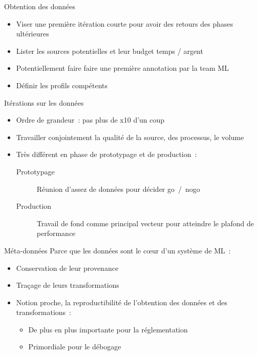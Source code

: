 \begin{frame}{Obtention des données}
  \begin{itemize}
    \item Viser une première itération courte pour avoir des retours des phases ultérieures
    \item Lister les sources potentielles et leur budget temps / argent
    \item Potentiellement faire faire une première annotation par la team ML
    \item Définir les profils compétents
  \end{itemize}
\end{frame}

\begin{frame}{Itérations sur les données}
  \begin{itemize}
    \item Ordre de grandeur~: pas plus de x10 d'un coup
    \item Travailler conjointement la qualité de la source, des processus, le volume
    \item Très différent en phase de prototypage et de production~:
      \begin{description}
        \item[Prototypage] Réunion d'assez de données pour décider go~/~nogo
        \item[Production] Travail de fond comme principal vecteur pour atteindre le plafond de performance
      \end{description}
  \end{itemize}
\end{frame}

\begin{frame}{Méta-données}
  Parce que les données sont le cœur d'un système de ML~:
  \begin{itemize}
    \item Conservation de leur provenance
    \item Traçage de leurs transformations
    \item Notion proche, la reproductibilité de l'obtention des données et des transformations~:
      \begin{itemize}
        \item De plus en plus importante pour la réglementation
        \item Primordiale pour le débogage
      \end{itemize}
  \end{itemize}
\end{frame}

